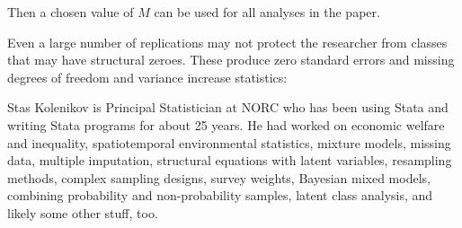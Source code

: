 Then a chosen value of $M$ can be used for all analyses in the paper.

Even a large number of replications may not protect the researcher
from classes that may have structural zeroes. These produce
zero standard errors and missing degrees of freedom and 
variance increase statistics:

\begin{stlog}
\nullskip
\end{stlog}



\newpage







\begin{aboutauthors}
Stas Kolenikov is Principal Statistician at NORC who has been
using Stata and writing Stata programs for about 25 years.
He had worked on economic welfare and inequality, spatiotemporal
environmental statistics, mixture models, missing data,
multiple imputation, structural equations with latent variables,
resampling methods, complex sampling designs, survey weights,
Bayesian mixed models, combining probability and non-probability samples,
latent class analysis, and likely some other stuff, too.
\end{aboutauthors}

\endinput

